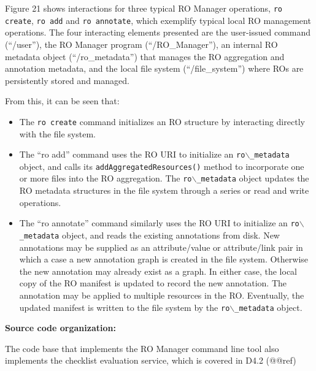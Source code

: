 Figure 21 shows interactions for three typical RO Manager operations, \texttt{ro create}, \texttt{ro add} and
\texttt{ro annotate}, which exemplify typical local RO management operations. The four interacting elements presented are the user-issued command (``/user''), the RO Manager program (``/RO\_Manager''), an internal RO metadata object (``/ro\_metadata'') that manages the RO aggregation and annotation metadata, and the local file system (``/file\_system'') where ROs are persistently stored and managed.

From this, it can be seen that:

\begin{itemize}

\item The \texttt{ro create} command initializes an RO structure by interacting directly with the file system.


\item The ``ro add'' command uses the RO URI to initialize an \texttt{ro$\backslash$\_metadata} object, and calls its \texttt{addAggregatedResources()} method to incorporate one or more files into the RO aggregation. The \texttt{ro$\backslash$\_metadata} object updates the RO metadata structures in the file system through a series or read and write operations.


\item The ``ro annotate'' command similarly uses the RO URI to initialize an \texttt{ro$\backslash$\_metadata} object, and reads the existing annotations from disk. New annotations may be supplied as an attribute/value or attribute/link pair in which a case a new annotation graph is created in the file system. Otherwise the new annotation may already exist as a graph. In either case, the local copy of the RO manifest is updated to record the new annotation. The annotation may be applied to multiple resources in the RO. Eventually, the updated manifest is written to the file system by the \texttt{ro$\backslash$\_metadata} object.


\end{itemize}

\textbf{Source code organization:}
\label{sourcecodeorganization:}

The code base that implements the RO Manager command line tool also implements the checklist evaluation service, which is covered in D4.2 (@@ref)

